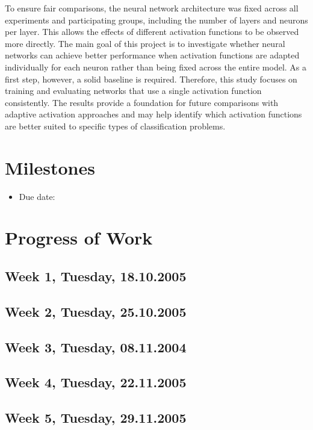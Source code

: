 \documentclass[12pt,fleqn,a4paper]{article}
\begin{document}
To ensure fair comparisons, the neural network architecture was fixed across all 
experiments and participating groups, including the number of layers and neurons per 
layer. This allows the effects of different activation functions to be observed more directly. 
The main goal of this project is to investigate whether neural networks can achieve better 
performance when activation functions are adapted individually for each neuron rather 
than being fixed across the entire model. As a first step, however, a solid baseline is 
required. Therefore, this study focuses on training and evaluating networks that use a 
single activation function consistently. 
The results provide a foundation for future comparisons with adaptive activation 
approaches and may help identify which activation functions are better suited to specific 
types of classification problems.
\newpage

\section{Milestones} %
\begin{itemize}
\item{Due date:}
\end{itemize}

\newpage

\section{Progress of Work} %

\subsection{Week 1, Tuesday, 18.10.2005}

\subsection{Week 2, Tuesday, 25.10.2005}

\subsection{Week 3, Tuesday, 08.11.2004}

\subsection{Week 4, Tuesday, 22.11.2005}

\subsection{Week 5, Tuesday, 29.11.2005}
\end{document}
